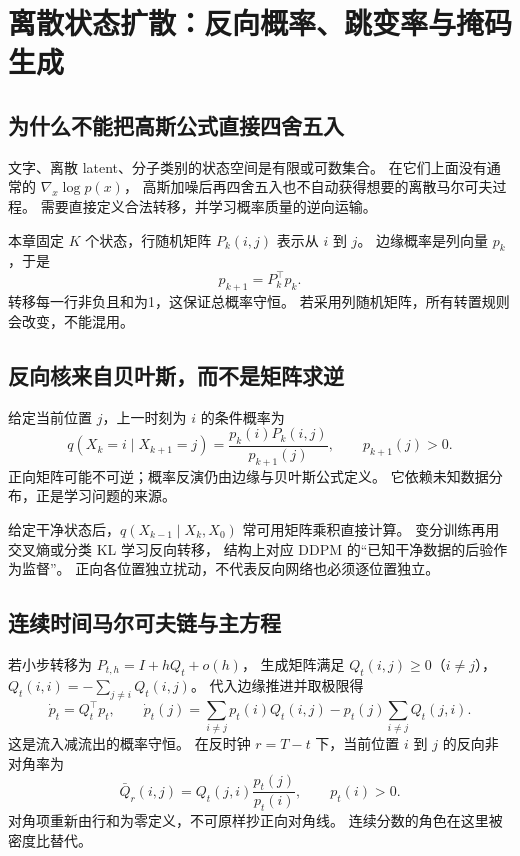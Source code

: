\chapter{离散状态扩散：反向概率、跳变率与掩码生成}
\label{th:discrete}

\section{为什么不能把高斯公式直接四舍五入}

文字、离散 latent、分子类别的状态空间是有限或可数集合。
在它们上面没有通常的 $\nabla_x\log p(x)$，
高斯加噪后再四舍五入也不自动获得想要的离散马尔可夫过程。
需要直接定义合法转移，并学习概率质量的逆向运输。

本章固定 $K$ 个状态，行随机矩阵 $P_k(i,j)$ 表示从 $i$ 到 $j$。
边缘概率是列向量 $p_k$，于是
\begin{equation}\label{th:discrete-forward}
p_{k+1}=P_k^\top p_k.
\end{equation}
转移每一行非负且和为1，这保证总概率守恒。
若采用列随机矩阵，所有转置规则会改变，不能混用。

\section{反向核来自贝叶斯，而不是矩阵求逆}

给定当前位置 $j$，上一时刻为 $i$ 的条件概率为
\begin{equation}\label{th:discrete-reverse}
q(X_k=i\mid X_{k+1}=j)=\frac{p_k(i)P_k(i,j)}{p_{k+1}(j)},
\qquad p_{k+1}(j)>0.
\end{equation}
正向矩阵可能不可逆；概率反演仍由边缘与贝叶斯公式定义。
它依赖未知数据分布，正是学习问题的来源。

给定干净状态后，$q(X_{k-1}\mid X_k,X_0)$ 常可用矩阵乘积直接计算。
变分训练再用交叉熵或分类 KL 学习反向转移，
结构上对应 DDPM 的“已知干净数据的后验作为监督”。
正向各位置独立扰动，不代表反向网络也必须逐位置独立。

\section{连续时间马尔可夫链与主方程}

若小步转移为 $P_{t,h}=I+hQ_t+o(h)$，
生成矩阵满足 $Q_t(i,j)\geq0$（$i\ne j$），
$Q_t(i,i)=-\sum_{j\ne i}Q_t(i,j)$。
代入边缘推进并取极限得
\begin{equation}\label{th:master}
\dot p_t=Q_t^\top p_t,
\qquad
\dot p_t(j)=\sum_{i\ne j}p_t(i)Q_t(i,j)
 -p_t(j)\sum_{i\ne j}Q_t(j,i).
\end{equation}
这是流入减流出的概率守恒。
在反时钟 $r=T-t$ 下，当前位置 $i$ 到 $j$ 的反向非对角率为
\begin{equation}\label{th:reverse-rates}
\bar Q_r(i,j)=Q_t(j,i)\frac{p_t(j)}{p_t(i)},\qquad p_t(i)>0.
\end{equation}
对角项重新由行和为零定义，不可原样抄正向对角线。
连续分数的角色在这里被密度比替代。

